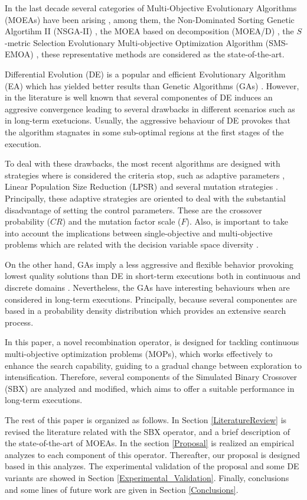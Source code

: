 In the last decade several categories of Multi-Objective Evolutionary Algorithms (MOEAs) have been arising \cite{Joel:Kalyanmoy,Joel:Coello}, among them, the Non-Dominated Sorting Genetic Algortihm II (NSGA-II) \cite{Joel:NSGAII}, the MOEA based on decomposition (MOEA/D) \cite{Joel:MOEAD}, the $S$-metric Selection Evolutionary Multi-objective Optimization Algorithm (SMS-EMOA) \cite{Joel:SMSEMOA}, these representative methods are considered as the state-of-the-art.

Differential Evolution (DE) is a popular and efficient Evolutionary Algorithm (EA) which has yielded better results than Genetic Algorithms (GAs) \cite{tuvsar2007differential, mi2010improved}.
%
However, in the literature is well known that several componentes of DE induces an aggresive convergence leading to several drawbacks in different scenarios such as in long-term exetucions.
%
Usually, the aggressive behaviour of DE provokes that the algorithm stagnates in some sub-optimal regions at the first stages of the execution.
%


To deal with these drawbacks, the most recent algorithms are designed with strategies where is considered the criteria stop, such as adaptive parameters \cite{brest2017single}, Linear Population Size Reduction (LPSR) \cite{brest2008population} and several mutation strategies \cite{das2011differential}.
%
Principally, these adaptive strategies are oriented to deal with the substantial disadvantage of setting the control parameters.
%
These are the crossover probability ($CR$) and the mutation factor scale ($F$).
%
%
Also, is important to take into account the implications between single-objective and multi-objective problems which are related with the decision variable space diversity \cite{kukkonen2007performance}.

%
On the other hand, GAs imply a less aggressive and flexible behavior provoking lowest quality solutions than DE in short-term executions both in continuous and discrete domains  \cite{tuvsar2007differential, mi2010improved}.
%
Nevertheless, the GAs have interesting behaviours when are considered in long-term executions.
%
Principally, because several componentes are based in a probability density distribution which provides an extensive search process.
%

In this paper, a novel recombination operator, is designed for tackling continuous multi-objective optimization problems (MOPs), which works effectively to enhance the search capability, guiding to a gradual change between exploration to intensification.
%
Therefore, several components of the Simulated Binary Crossover (SBX) are analyzed and modified, which aims to offer a suitable performance in long-term executions.
%

The rest of this paper is organized as follows.
%
In Section \ref{LiteratureReview} is revised the literature related with the SBX operator, and a brief description of the state-of-the-art of MOEAs.
%
In the section \ref{Proposal} is realized an empirical analyzes to each component of this operator.
%
Thereafter, our proposal is designed based in this analyzes.
%
The experimental validation of the proposal and some DE variants are showed in Section \ref{Experimental_Validation}.
%
Finally, conclusions and some lines of future work are given in Section \ref{Conclusions}.
